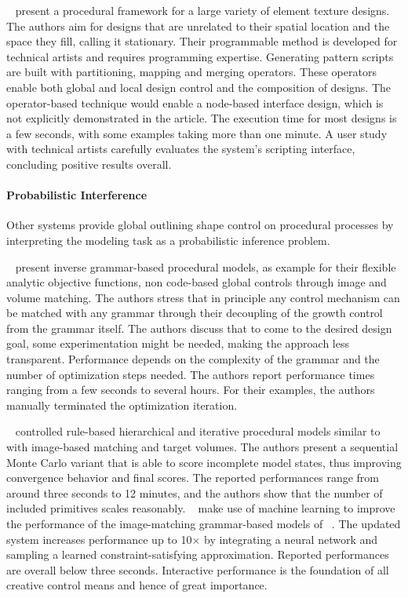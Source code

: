 \citeauthor*{loi_2017_pae}~\cite{loi_2017_pae} present a procedural framework for a large variety of element texture designs. The authors aim for designs that are unrelated to their spatial location and the space they fill, calling it stationary. Their programmable method is developed for technical artists and requires programming expertise. Generating pattern scripts are built with partitioning, mapping and merging operators. These operators enable both global and local design control and the composition of designs. The operator-based technique would enable a node-based interface design, which is not explicitly demonstrated in the article. The execution time for most designs is a few seconds, with some examples taking more than one minute. A user study with technical artists carefully evaluates the system's scripting interface, concluding positive results overall.

\paragraph*{Probabilistic Interference}
\label{para:analysis_rulebased_shapes_probabilistic}

Other systems provide global outlining shape control on procedural processes by interpreting the modeling task as a probabilistic inference problem.

\citeauthor*{talton_2011_mpm}~\cite{talton_2011_mpm} present inverse grammar-based procedural models, as example for their flexible analytic objective functions, non code-based global controls through image and volume matching. The authors stress that in principle any control mechanism can be matched with any grammar through their decoupling of the growth control from the grammar itself. The authors discuss that to come to the desired design goal, some experimentation might be needed, making the approach less transparent. Performance depends on the complexity of the grammar and the number of optimization steps needed. The authors report performance times ranging from a few seconds to several hours. For their examples, the authors manually terminated the optimization iteration.

\citeauthor*{ritchie_2015_cpm}~\cite{ritchie_2015_cpm} controlled rule-based hierarchical and iterative procedural models similar to \citeauthor*{talton_2011_mpm}~\cite{talton_2011_mpm} with image-based matching and target volumes. The authors present a sequential Monte Carlo variant that is able to score incomplete model states, thus improving convergence behavior and final scores. The reported performances range from around three seconds to 12 minutes, and the authors show that the number of included primitives scales reasonably. \citeauthor*{ritchie_2016_ngp}~\cite{ritchie_2016_ngp} make use of machine learning to improve the performance of the image-matching grammar-based models of \citeauthor*{ritchie_2015_cpm}~\cite{ritchie_2015_cpm}. The updated system increases performance up to 10$\times$ by integrating a neural network and sampling a learned constraint-satisfying approximation. Reported performances are overall below three seconds. Interactive performance is the foundation of all creative control means and hence of great importance.

